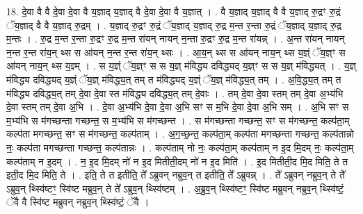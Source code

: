 \documentclass[17pt]{extarticle}
\begin{document}
18. दे॒वा वै वै दे॒वा दे॒वा वै य॒ज्ञाद् य॒ज्ञाद् वै दे॒वा दे॒वा वै य॒ज्ञात् । . वै य॒ज्ञाद् य॒ज्ञाद् वै वै य॒ज्ञाद् रु॒द्रꣳ रु॒द्रं ॅय॒ज्ञाद् वै वै य॒ज्ञाद् रु॒द्रम् । . य॒ज्ञाद् रु॒द्रꣳ रु॒द्रं ॅय॒ज्ञाद् य॒ज्ञाद् रु॒द्र म॒न्त र॒न्ता रु॒द्रं ॅय॒ज्ञाद् य॒ज्ञाद् रु॒द्र म॒न्तः । . रु॒द्र म॒न्त र॒न्ता रु॒द्रꣳ रु॒द्र म॒न्त रा॑यन् नायन् न॒न्ता रु॒द्रꣳ रु॒द्र म॒न्त रा॑यन्न् । . अ॒न्त रा॑यन् नायन् न॒न्त र॒न्त रा॑य॒न् थ्स स आ॑यन् न॒न्त र॒न्त रा॑य॒न् थ्सः । . आ॒य॒न् थ्स स आ॑यन् नाय॒न् थ्स य॒ज्ञ्ं ॅय॒ज्ञ्ꣳ स आ॑यन् नाय॒न् थ्स य॒ज्ञ्म् । . स य॒ज्ञ्ं ॅय॒ज्ञ्ꣳ स स य॒ज्ञ् म॑विद्ध्य दविद्ध्यद् य॒ज्ञ्ꣳ स स य॒ज्ञ् म॑विद्ध्यत् । . य॒ज्ञ् म॑विद्ध्य दविद्ध्यद् य॒ज्ञ्ं ॅय॒ज्ञ् म॑विद्ध्य॒त् तम् त म॑विद्ध्यद् य॒ज्ञ्ं ॅय॒ज्ञ् म॑विद्ध्य॒त् तम् । . अ॒वि॒द्ध्य॒त् तम् त म॑विद्ध्य दविद्ध्य॒त् तम् दे॒वा दे॒वा स्त म॑विद्ध्य दविद्ध्य॒त् तम् दे॒वाः । . तम् दे॒वा दे॒वा स्तम् तम् दे॒वा अ॒भ्य॑भि दे॒वा स्तम् तम् दे॒वा अ॒भि । . दे॒वा अ॒भ्य॑भि दे॒वा दे॒वा अ॒भि सꣳ स म॒भि दे॒वा दे॒वा अ॒भि सम् । . अ॒भि सꣳ स म॒भ्य॑भि स म॑गच्छन्ता गच्छन्त॒ स म॒भ्य॑भि स म॑गच्छन्त । . स म॑गच्छन्ता गच्छन्त॒ सꣳ स म॑गच्छन्त॒ कल्प॑ता॒म् कल्प॑ता मगच्छन्त॒ सꣳ स म॑गच्छन्त॒ कल्प॑ताम् । . अ॒ग॒च्छ॒न्त॒ कल्प॑ता॒म् कल्प॑ता मगच्छन्ता गच्छन्त॒ कल्प॑तान्नो नः॒ कल्प॑ता मगच्छन्ता गच्छन्त॒ कल्प॑तान्नः । . कल्प॑ताम् नो नः॒ कल्प॑ता॒म् कल्प॑ताम् न इ॒द मि॒दम् नः॒ कल्प॑ता॒म् कल्प॑ताम् न इ॒दम् । . न॒ इ॒द मि॒दम् नो॑ न इ॒द मितीती॒दम् नो॑ न इ॒द मिति॑ । . इ॒द मितीती॒द मि॒द मिति॒ ते त इती॒द मि॒द मिति॒ ते । . इति॒ ते त इतीति॒ ते᳚ ऽब्रुवन् नब्रुव॒न् त इतीति॒ ते᳚ ऽब्रुवन्न् । . ते᳚ ऽब्रुवन् नब्रुव॒न् ते ते᳚ ऽब्रुव॒न् थ्स्वि॑ष्टꣳ॒॒ स्वि॑ष्ट मब्रुव॒न् ते ते᳚ ऽब्रुव॒न् थ्स्वि॑ष्टम् । . अ॒ब्रु॒व॒न् थ्स्वि॑ष्टꣳ॒॒ स्वि॑ष्ट मब्रुवन् नब्रुव॒न् थ्स्वि॑ष्टं॒ ॅवै वै स्वि॑ष्ट मब्रुवन् नब्रुव॒न् थ्स्वि॑ष्टं॒ ॅवै । \newline
\end{document}
